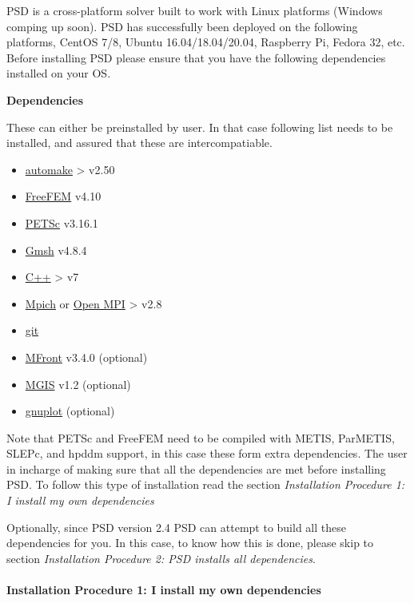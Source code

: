 

PSD is a cross-platform solver built to work with Linux platforms
(Windows comping up soon). PSD has successfully been deployed on the
following platforms, CentOS 7/8, Ubuntu 16.04/18.04/20.04, Raspberry Pi,
Fedora 32, etc. Before installing PSD please ensure that you have the
following dependencies installed on your OS.

\textbf{Dependencies}

These can either be preinstalled by user. In that case following list
needs to be installed, and assured that these are intercompatiable.

\begin{itemize}
\item
  \href{https://www.gnu.org/software/automake/}{automake} \textgreater{}
  v2.50
\item
  \href{https://freefem.org/}{FreeFEM} v4.10
\item
  \href{https://www.mcs.anl.gov/petsc/}{PETSc} v3.16.1
\item
  \href{http://gmsh.info/}{Gmsh} v4.8.4
\item
  \href{http://www.cplusplus.com/}{C++} \textgreater{} v7
\item
  \href{https://www.mpich.org/}{Mpich} or
  \href{https://www.open-mpi.org/}{Open MPI} \textgreater{} v2.8
\item
  \href{https://git-scm.com/}{git}
\item
  \href{http://tfel.sourceforge.net/}{MFront} v3.4.0 (optional)
\item
  \href{https://thelfer.github.io/mgis/web/bindings-cxx.html}{MGIS} v1.2
  (optional)
\item
  \href{http://www.gnuplot.info/}{gnuplot} (optional)
\end{itemize}

Note that PETSc and FreeFEM need to be compiled with METIS, ParMETIS,
SLEPc, and hpddm support, in this case these form extra dependencies.
The user in incharge of making sure that all the dependencies are met
before installing PSD. To follow this type of installation read the
section \emph{Installation Procedure 1: I install my own dependencies}

Optionally, since PSD version 2.4 PSD can attempt to build all these
dependencies for you. In this case, to know how this is done, please
skip to section \emph{Installation Procedure 2: PSD installs all
dependencies}.

\paragraph{Installation Procedure 1: I install my own dependencies}

